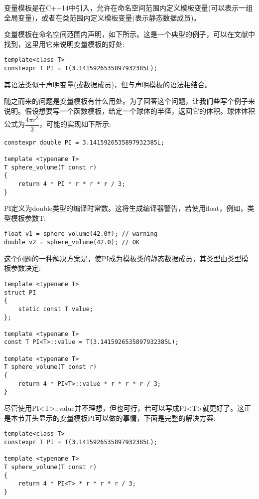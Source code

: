 变量模板是在C++14中引入，允许在命名空间范围内定义模板变量(可以表示一组全局变量)，或者在类范围内定义模板变量(表示静态数据成员)。

变量模板在命名空间范围内声明，如下所示。这是一个典型的例子，可以在文献中找到，这里用它来说明变量模板的好处:

\begin{lstlisting}[style=styleCXX]
template<class T>
constexpr T PI = T(3.1415926535897932385L);
\end{lstlisting}

其语法类似于声明变量(或数据成员)，但与声明模板的语法相结合。

随之而来的问题是变量模板有什么用处。为了回答这个问题，让我们些写个例子来说明。假设想要写一个函数模板，给定一个球体的半径，返回它的体积。球体体积公式为$\dfrac{4\pi r^{3}}{3}$，可能的实现如下所示:

\begin{lstlisting}[style=styleCXX]
constexpr double PI = 3.1415926535897932385L;

template <typename T>
T sphere_volume(T const r)
{
	return 4 * PI * r * r * r / 3;
}
\end{lstlisting}

PI定义为double类型的编译时常数。这将生成编译器警告，若使用float，例如，类型模板参数T:

\begin{lstlisting}[style=styleCXX]
float v1 = sphere_volume(42.0f); // warning
double v2 = sphere_volume(42.0); // OK
\end{lstlisting}

这个问题的一种解决方案是，使PI成为模板类的静态数据成员，其类型由类型模板参数决定:

\begin{lstlisting}[style=styleCXX]
template <typename T>
struct PI
{
	static const T value;
};

template <typename T>
const T PI<T>::value = T(3.1415926535897932385L);

template <typename T>
T sphere_volume(T const r)
{
	return 4 * PI<T>::value * r * r * r / 3;
}
\end{lstlisting}

尽管使用PI<T>::value并不理想，但也可行，若可以写成PI<T>就更好了。这正是本节开头显示的变量模板PI可以做的事情，下面是完整的解决方案:

\begin{lstlisting}[style=styleCXX]
template<class T>
constexpr T PI = T(3.1415926535897932385L);

template <typename T>
T sphere_volume(T const r)
{
	return 4 * PI<T> * r * r * r / 3;
}
\end{lstlisting}

